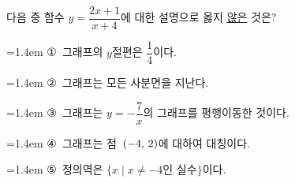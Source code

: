 \hspace*{2mm}\begin{minipage}[t]{\dimexpr\linewidth-2mm\relax}\vspace{0pt}
다음 중 함수 $y=\dfrac{2x+1}{x+4}$에 대한 설명으로 옳지 \underline{않은} 것은?
\par\medskip\par\noindent\hangindent=1.4em {\small ①}\ 그래프의 $y$절편은 $\dfrac{1}{4}$이다.\par\noindent\hangindent=1.4em {\small ②}\ 그래프는 모든 사분면을 지난다.\par\noindent\hangindent=1.4em {\small ③}\ 그래프는 $y=-\dfrac{7}{x}$의 그래프를 평행이동한 것이다.\par\noindent\hangindent=1.4em {\small ④}\ 그래프는 점~$(-4,\mkern3mu 2)$에 대하여 대칭이다.\par\noindent\hangindent=1.4em {\small ⑤}\ 정의역은 $\{x \mid x\ne -4$인 실수$\}$이다.\par\medskip\end{minipage}
